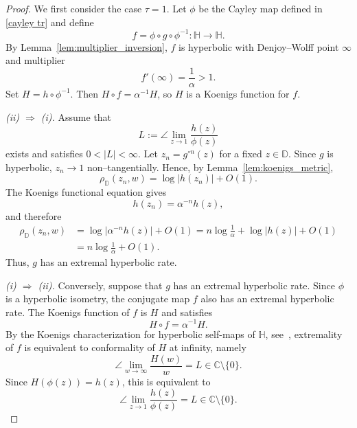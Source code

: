 \documentclass[10pt,a4paper]{amsart}
\numberwithin{equation}{section}
\begin{document}
\begin{proof}
We first consider the case $\tau=1$. Let $\phi$ be the Cayley map defined in \eqref{cayley tr}
and define
\begin{equation*}
f=\phi\circ g\circ\phi^{-1}:\mathbb{H}\to\mathbb{H}.
\end{equation*}
By Lemma~\ref{lem:multiplier_inversion}, $f$ is hyperbolic with
Denjoy--Wolff point $\infty$ and multiplier
\begin{equation*}
f'(\infty)=\frac1\alpha>1.
\end{equation*}
Set
$H=h\circ\phi^{-1}.$
Then
$H\circ f=\alpha^{-1}H$,
so $H$ is a Koenigs function for $f$.

\medskip
\noindent\emph{(ii) $\Rightarrow$ (i).}
Assume that
\begin{equation*}
L:=\angle\lim_{z\to1}\frac{h(z)}{\phi(z)}
\end{equation*}
exists and satisfies $0<|L|<\infty$. Let
$z_n=g^{\circ n}(z)$ for a fixed $z\in\mathbb{D}$. Since $g$ is
hyperbolic, $z_n\to1$ non--tangentially. Hence, by
Lemma~\ref{lem:koenigs_metric},
\begin{equation*}
\rho_{\mathbb{D}}(z_n,w)
=
\log|h(z_n)|+O(1).
\end{equation*}
The Koenigs functional equation gives
\begin{equation*}
h(z_n)=\alpha^{-n}h(z),
\end{equation*}
and therefore
\begin{align*}
\rho_{\mathbb{D}}(z_n,w)
&=
\log|\alpha^{-n}h(z)|+O(1)
=
n\log\frac1\alpha+\log|h(z)|+O(1)\\
&=
n\log\frac1\alpha+O(1).
\end{align*}
Thus, $g$ has an extremal hyperbolic rate.

\medskip
\noindent\emph{(i) $\Rightarrow$ (ii).}
Conversely, suppose that $g$ has an extremal hyperbolic rate. Since
$\phi$ is a hyperbolic isometry, the conjugate map $f$ also has an
extremal hyperbolic rate. The Koenigs function of $f$ is $H$ and
satisfies
\begin{equation*}
H\circ f=\alpha^{-1}H.
\end{equation*}
By the Koenigs characterization for hyperbolic self-maps of
$\mathbb{H}$, see~\cite[Theorem~5.2]{cruz}, extremality of $f$ is
equivalent to conformality of $H$ at infinity, namely
\begin{equation*}
\angle\lim_{w\to\infty}\frac{H(w)}{w}
=L
\in\mathbb{C}\setminus\{0\}.
\end{equation*}
Since $H(\phi(z))=h(z)$, this is equivalent to
\begin{equation*}
\angle\lim_{z\to1}\frac{h(z)}{\phi(z)}
=
L
\in\mathbb{C}\setminus\{0\}.
\end{equation*}


\end{proof}
\end{document}
